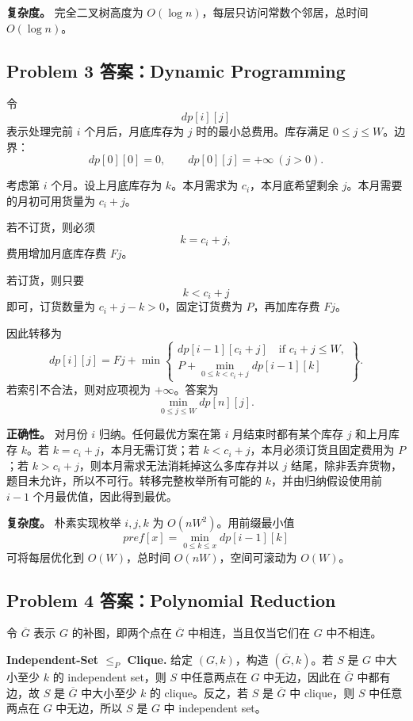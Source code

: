 \documentclass[UTF8,a4paper,11pt]{ctexart}
\begin{document}
\textbf{复杂度。} 完全二叉树高度为 $O(\log n)$，每层只访问常数个邻居，总时间 $O(\log n)$。

\subsection*{Problem 3 答案：Dynamic Programming}

令
\[
dp[i][j]
\]
表示处理完前 $i$ 个月后，月底库存为 $j$ 时的最小总费用。库存满足 $0\le j\le W$。边界：
\[
dp[0][0]=0,\qquad dp[0][j]=+\infty\ (j>0).
\]

考虑第 $i$ 个月。设上月底库存为 $k$。本月需求为 $c_i$，本月底希望剩余 $j$。本月需要的月初可用货量为 $c_i+j$。

若不订货，则必须
\[
k=c_i+j,
\]
费用增加月底库存费 $Fj$。

若订货，则只要
\[
k<c_i+j
\]
即可，订货数量为 $c_i+j-k>0$，固定订货费为 $P$，再加库存费 $Fj$。

因此转移为
\[
dp[i][j]
=Fj+\min\left\{
\begin{array}{l}
dp[i-1][c_i+j]\quad \text{if }c_i+j\le W,\\[0.3em]
P+\min\limits_{0\le k<c_i+j}dp[i-1][k]
\end{array}
\right\}.
\]
若索引不合法，则对应项视为 $+\infty$。答案为
\[
\min_{0\le j\le W} dp[n][j].
\]

\textbf{正确性。} 对月份 $i$ 归纳。任何最优方案在第 $i$ 月结束时都有某个库存 $j$ 和上月库存 $k$。若 $k=c_i+j$，本月无需订货；若 $k<c_i+j$，本月必须订货且固定费用为 $P$；若 $k>c_i+j$，则本月需求无法消耗掉这么多库存并以 $j$ 结尾，除非丢弃货物，题目未允许，所以不可行。转移完整枚举所有可能的 $k$，并由归纳假设使用前 $i-1$ 个月最优值，因此得到最优。

\textbf{复杂度。} 朴素实现枚举 $i,j,k$ 为 $O(nW^2)$。用前缀最小值
\[
pref[x]=\min_{0\le k\le x}dp[i-1][k]
\]
可将每层优化到 $O(W)$，总时间 $O(nW)$，空间可滚动为 $O(W)$。

\subsection*{Problem 4 答案：Polynomial Reduction}

令 $\overline G$ 表示 $G$ 的补图，即两个点在 $\overline G$ 中相连，当且仅当它们在 $G$ 中不相连。

\textbf{Independent-Set $\le_P$ Clique.} 给定 $(G,k)$，构造 $(\overline G,k)$。若 $S$ 是 $G$ 中大小至少 $k$ 的 independent set，则 $S$ 中任意两点在 $G$ 中无边，因此在 $\overline G$ 中都有边，故 $S$ 是 $\overline G$ 中大小至少 $k$ 的 clique。反之，若 $S$ 是 $\overline G$ 中 clique，则 $S$ 中任意两点在 $G$ 中无边，所以 $S$ 是 $G$ 中 independent set。
\end{document}
